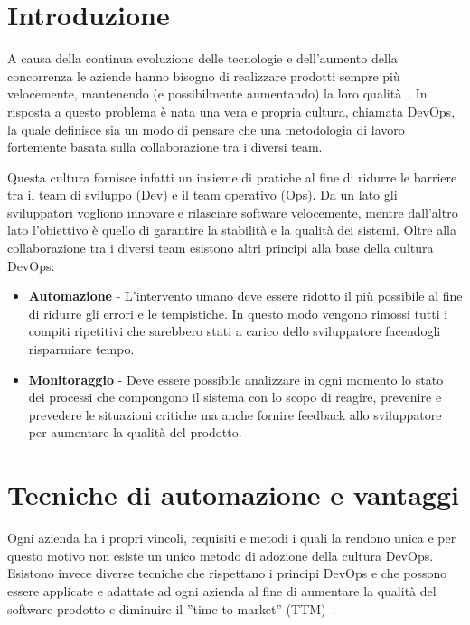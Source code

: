 
\section{Introduzione}
A causa della continua evoluzione delle tecnologie e dell'aumento della concorrenza le aziende hanno bisogno di realizzare prodotti sempre più velocemente, 
mantenendo (e possibilmente aumentando) la loro qualità~\cite{krief2019learning}. 
In risposta a questo problema è nata una vera e propria cultura, chiamata DevOps, 
la quale definisce sia un modo di pensare che una metodologia di lavoro fortemente basata sulla collaborazione tra i diversi team.

Questa cultura fornisce infatti un insieme di pratiche al fine di ridurre le barriere tra il team di sviluppo (Dev) e il team operativo (Ops). 
Da un lato gli sviluppatori vogliono innovare e rilasciare software velocemente, 
mentre dall'altro lato l'obiettivo è quello di garantire la stabilità e la qualità dei sistemi.
Oltre alla collaborazione tra i diversi team esistono altri principi alla base della cultura DevOps:

\begin{itemize}
    \item \textbf{Automazione} - L'intervento umano deve essere ridotto il più possibile al fine di ridurre gli errori e le tempistiche. In questo modo vengono rimossi tutti i compiti ripetitivi che sarebbero stati a carico dello sviluppatore facendogli risparmiare tempo.
    
    \item \textbf{Monitoraggio} - Deve essere possibile analizzare in ogni momento lo stato dei processi che compongono il sistema con lo scopo di reagire, prevenire e prevedere le situazioni critiche ma anche fornire feedback allo sviluppatore per aumentare la qualità del prodotto.
\end{itemize}

\section{Tecniche di automazione e vantaggi}
Ogni azienda ha i propri vincoli, 
requisiti e metodi i quali la rendono unica e per questo motivo non esiste un unico metodo di adozione della cultura DevOps.
Esistono invece diverse tecniche che rispettano i principi DevOps e che possono essere applicate e adattate ad ogni azienda al fine di aumentare la qualità del software prodotto e diminuire il ''time-to-market'' (TTM)~\cite{devis2016effective}.

